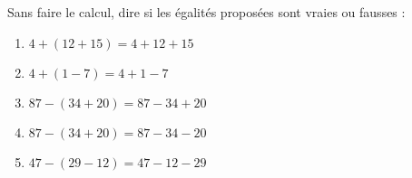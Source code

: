 
\begin{exercice}\label{exo2smath-0103}

Sans faire le calcul, dire si les égalités proposées sont vraies ou fausses :
\begin{enumerate}
    \item
        \( 4+(12+15)=4+12+15\)
    \item
        \( 4+(1-7)=4+1-7\)
    \item
        \( 87-(34+20)=87-34+20\)
    \item 
        \( 87-(34+20)=87-34-20\)
    \item 
        \( 47-(29-12)=47-12-29\)
\end{enumerate}

\end{exercice}
